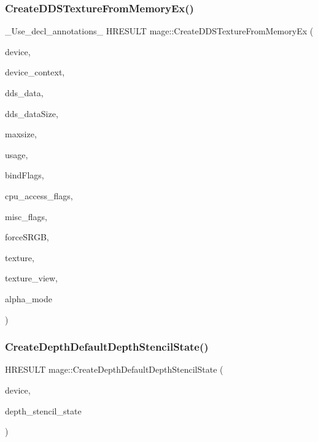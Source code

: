 \subsubsection{\texorpdfstring{Create\+D\+D\+S\+Texture\+From\+Memory\+Ex()}{CreateDDSTextureFromMemoryEx()}\hspace{0.1cm}{\footnotesize\ttfamily [4/4]}}
{\footnotesize\ttfamily \+\_\+\+Use\+\_\+decl\+\_\+annotations\+\_\+ H\+R\+E\+S\+U\+LT mage\+::\+Create\+D\+D\+S\+Texture\+From\+Memory\+Ex (\begin{DoxyParamCaption}\item[{I\+D3\+D11\+Device2 $\ast$}]{device,  }\item[{I\+D3\+D11\+Device\+Context $\ast$}]{device\+\_\+context,  }\item[{const uint8\+\_\+t $\ast$}]{dds\+\_\+data,  }\item[{size\+\_\+t}]{dds\+\_\+data\+Size,  }\item[{size\+\_\+t}]{maxsize,  }\item[{D3\+D11\+\_\+\+U\+S\+A\+GE}]{usage,  }\item[{uint32\+\_\+t}]{bind\+Flags,  }\item[{uint32\+\_\+t}]{cpu\+\_\+access\+\_\+flags,  }\item[{uint32\+\_\+t}]{misc\+\_\+flags,  }\item[{bool}]{force\+S\+R\+GB,  }\item[{I\+D3\+D11\+Resource $\ast$$\ast$}]{texture,  }\item[{I\+D3\+D11\+Shader\+Resource\+View $\ast$$\ast$}]{texture\+\_\+view,  }\item[{\hyperlink{namespacemage_a0c586a2bad862f4858900ca121ca80c2}{D\+D\+S\+\_\+\+A\+L\+P\+H\+A\+\_\+\+M\+O\+DE} $\ast$}]{alpha\+\_\+mode }\end{DoxyParamCaption})}

\hypertarget{namespacemage_adc620b251acd7cb9c4b5f905607ceee5}{}\label{namespacemage_adc620b251acd7cb9c4b5f905607ceee5} 
\subsubsection{\texorpdfstring{Create\+Depth\+Default\+Depth\+Stencil\+State()}{CreateDepthDefaultDepthStencilState()}}
{\footnotesize\ttfamily H\+R\+E\+S\+U\+LT mage\+::\+Create\+Depth\+Default\+Depth\+Stencil\+State (\begin{DoxyParamCaption}\item[{I\+D3\+D11\+Device2 $\ast$}]{device,  }\item[{I\+D3\+D11\+Depth\+Stencil\+State $\ast$$\ast$}]{depth\+\_\+stencil\+\_\+state }\end{DoxyParamCaption})}


